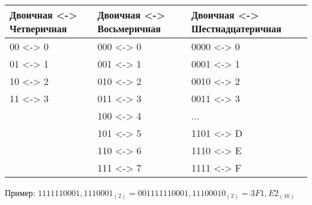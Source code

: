 \begin{tabular}{|m{3.5cm}|m{3.5cm}|m{3.5cm}|}
\hline
    \textbf{\scriptsize{Двоичная <-> Четверичная}} & \textbf{\scriptsize{Двоичная <-> Восьмеричная}} & \textbf{\scriptsize{Двоичная <-> Шестнадцатеричная}}\\
    \hline
    00 <-> 0 & 000 <-> 0 & 0000 <-> 0 \\
    \hline
    01 <-> 1 & 001 <-> 1 & 0001 <-> 1 \\
    \hline
    10 <-> 2 & 010 <-> 2 & 0010 <-> 2 \\
    \hline
    11 <-> 3 & 011 <-> 3 & 0011 <-> 3 \\
    \hline
    & 100 <-> 4 & ... \\
    \hline
    & 101 <-> 5 & 1101 <-> D \\
    \hline
    & 110 <-> 6 & 1110 <-> E \\
    \hline
    & 111 <-> 7 & 1111 <-> F \\
    \hline
\end{tabular}
Пример: $1111110001,1110001_{(2)} = 0011 1111 0001,1110 0010_{(2)} = 3F1,E2_{(16)}$
